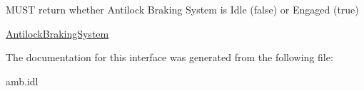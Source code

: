 M\-U\-S\-T return whether Antilock Braking System is Idle (false) or Engaged (true) 

\hyperlink{interfaceVehicle_1_1AntilockBrakingSystem}{Antilock\-Braking\-System} 

The documentation for this interface was generated from the following file\-:\begin{DoxyCompactItemize}
\item 
amb.\-idl\end{DoxyCompactItemize}
